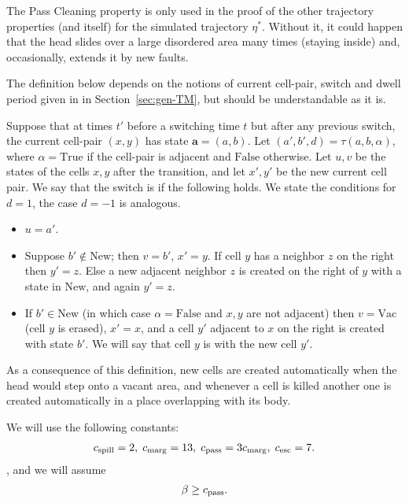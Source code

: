 \documentclass[11pt]{memoir}
\theoremstyle{definition} %
\renewcommand{\ge}{\geq}
\renewcommand{\vek}[1]{\mathbf{#1}}
\newcommand{\va}{\vek{a}} %
\newcommand{\Vacant}{\mathrm{Vac}}
\newcommand{\New}{\mathrm{New}}
\newcommand{\True}{\mathrm{True}}
\newcommand{\False}{\mathrm{False}}
\newcommand{\cns}[1]{c_{\textrm{\upshape #1}}}
\newcommand{\CEsc}{\cns{esc}}
\newcommand{\CMarg}{\cns{marg}}
\newcommand{\CPass}{\cns{pass}}
\newcommand{\CSpill}{\cns{spill}}
\begin{document}
\begin{remark}
The Pass Cleaning property is only used in the proof of the other trajectory properties
(and itself) for the simulated trajectory \( \eta^{*} \).
Without it, it could happen that
the head slides over a large disordered area many times (staying inside) and, occasionally,
extends it by new faults.  
\end{remark}

The definition below depends on the notions of current cell-pair, switch and dwell period given in
 in Section~\ref{sec:gen-TM}, but should be understandable as it is.

\begin{definition}\label{def:dictated}
Suppose that at times \( t' \) before a switching time \( t \) but after 
any previous switch, the current cell-pair \( (x,y) \) has state \( \va = (a,b)\).
Let \( (a',b',d) =\tau(a,b,\alpha) \), where \( \alpha=\True \) if the cell-pair is adjacent and \( \False \)
otherwise.
Let \( u,v \) be the states of the cells \( x,y \) after the transition, and
let \( x',y' \) be the new current cell pair.
We say that the switch is  if the following holds.
We state the conditions for \( d=1 \), the case \( d=-1 \) is analogous.
\begin{itemize}
\item \( u=a' \).
  
  \item Suppose \( b'\not\in\New \); then \( v=b' \), \( x'=y \).
    If cell \( y \) has a neighbor \( z \) on the right then \( y'=z \).
    Else a new adjacent neighbor \( z \) is created on the right of \( y \)
    with a state in \( \New \), and again \( y'=z \).

  \item If \( b'\in\New \) (in which case \( \alpha=\False \) and \( x,y \) are not adjacent)
    then \( v=\Vacant \) (cell \( y \) is erased), \( x'=x \), and a cell \( y' \) adjacent to \( x \) on the right
    is created with state \( b' \).
    We will say that cell \( y \) is  with the new cell \( y' \).
\end{itemize}
\end{definition}

As a consequence of this definition, new cells are created
automatically when the head would step onto a vacant area,
and whenever a cell is killed another one is created automatically in a place overlapping with its body.

We will use the following constants:
\begin{align}\label{eq:cns.traj}
  \CSpill =2,\;
  \CMarg = 13,\;
  \CPass = 3\CMarg,\;
  \CEsc = 7.
\end{align},
and we will assume
\begin{align}\label{eq:beta-lb}
  \beta\ge \CPass.
\end{align}
\end{document}
